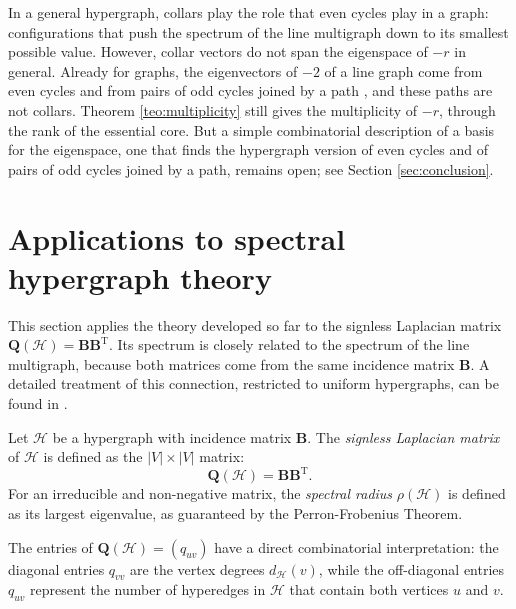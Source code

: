 \documentclass[12pt,reqno]{amsart}
\begin{document}
\begin{remark}\label{rem:collar_basis}
In a general hypergraph, collars play the role that even cycles play in a graph: configurations that push the spectrum of the line multigraph down to its smallest possible value. However, collar vectors do not span the eigenspace of $-r$ in general. Already for graphs, the eigenvectors of $-2$ of a line graph come from even cycles and from pairs of odd cycles joined by a path \cite{line-spec}, and these paths are not collars. Theorem \ref{teo:multiplicity} still gives the multiplicity of $-r$, through the rank of the essential core. But a simple combinatorial description of a basis for the eigenspace, one that finds the hypergraph version of even cycles and of pairs of odd cycles joined by a path, remains open; see Section \ref{sec:conclusion}.
\end{remark}



\section{Applications to spectral hypergraph theory}\label{sec:App}

This section applies the theory developed so far to the signless Laplacian matrix $\mathbf{Q}(\mathcal{H}) = \mathbf{B}\mathbf{B}^\mathrm{T}$. Its spectrum is closely related to the spectrum of the line multigraph, because both matrices come from the same incidence matrix $\mathbf{B}$. A detailed treatment of this connection, restricted to uniform hypergraphs, can be found in \cite{kaue-energia,kaue-lap}.


\begin{definition}\label{def:signless_laplacian}
Let $\mathcal{H}$ be a hypergraph with incidence matrix $\mathbf{B}$. The \textit{signless Laplacian matrix} of $\mathcal{H}$ is defined as the $|V| \times |V|$ matrix:$$\mathbf{Q}(\mathcal{H}) = \mathbf{B}\mathbf{B}^\mathrm{T}.$$For an irreducible and non-negative matrix, the \textit{spectral radius} $\rho(\mathcal{H})$ is defined as its largest eigenvalue, as guaranteed by the Perron-Frobenius Theorem.
\end{definition}
\begin{remark}
The entries of $\mathbf{Q}(\mathcal{H}) = (q_{uv})$ have a direct combinatorial interpretation: the diagonal entries $q_{vv}$ are the vertex degrees $d_{\mathcal{H}}(v)$, while the off-diagonal entries $q_{uv}$ represent the number of hyperedges in $\mathcal{H}$ that contain both vertices $u$ and $v$.
\end{remark}
\end{document}
